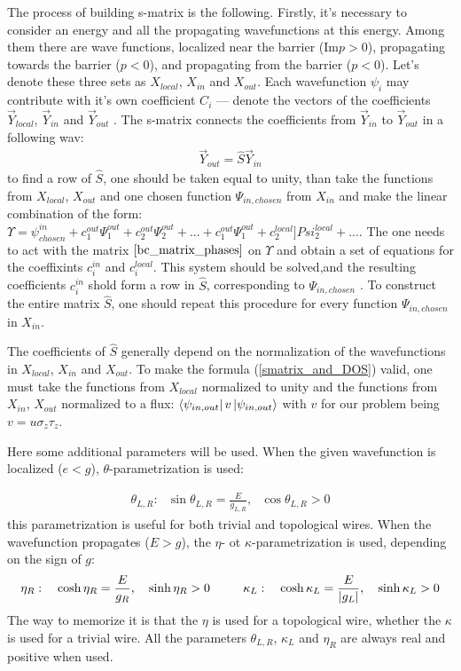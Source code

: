 The process of building s-matrix is the following. Firstly, it's necessary to consider an energy and all the propagating  wavefunctions at this energy. Among them there are wave functions, localized near the barrier ($ \mathrm{Im}p>0 $), propagating towards the barrier ($  p<0 $), and propagating from the barrier ($ p<0 $). Let's denote these  three sets as $ X_{local} $, $ X_{in}  $ and $ X_{out} $. Each wavefunction $ \psi_i $ may contribute with it's own coefficient $ C_i $ --- denote the vectors of the coefficients  $ \vec{Y}_{local} $, $ \vec{Y}_{in}  $ and $ \vec{Y}_{out} $ . The s-matrix connects the coefficients from $ \vec{Y}_{in}  $ to $ \vec{Y}_{out} $ in a following wav:
\begin{gather}
	\vec{Y}_{out} = \hat{S}\vec{Y}_{in}
\end{gather}
to find a row of $ \hat{S} $, one should be taken equal to unity, than take  the functions from $ X_{local} $, $ X_{out} $ and one chosen function $ \Psi_{in,chosen} $ from $ X_{in} $ and make the linear combination of the form: $\Upsilon =\psi^{in}_{chosen} + c^{out}_1\Psi^{out}_1+c^{out}_2\Psi^{out}_2+...+c^{out}_1\Psi^{out}_1+c^{local}_2]Psi^{local}_2+... $. The one needs to act with the matrix $ \ref{bc_matrix_phases} $ on $ \Upsilon $ and obtain a set of equations for the coeffixints $ {c^{in}_i} $ and $ {c^{local}_i} $. This system should be solved,and the resulting coefficients ${c^{in}_i}  $ shold form a row in $ \hat{S} $, corresponding to $ \Psi_{in,chosen} $ . To construct the entire matrix $ \hat{S} $, one should repeat this procedure for every function $ \Psi_{in,chosen} $ in $ X_{in} $.

The coefficients of $ \hat{S} $ generally depend on the normalization of the wavefunctions in $ X_{local} $, $ X_{in}  $ and $ X_{out} $. To make the formula (\ref{smatrix_and_DOS}) valid, one must take the functions from $ X_{local} $ normalized to unity and the functions from $ X_{in}  $, $ X_{out}$ normalized to a flux\cite{Akkermans_Avron_Shapiro_scattering_matrix}: $ \bra{\psi_{in,out}}v \ket{\psi_{in,out}} $ with $ v $ for our problem being $ v=u\sigma_z\tau_z $.

Here some additional parameters will be used. When the given wavefunction is localized ($ e<g $), $ \theta $-parametrization is used:

\begin{gather}
\theta_{L,R}:~~~\sin \theta_{L,R} =\frac{E}{g_{L,R}},~~~\cos \theta_{L,R}>0
\end{gather}
this parametrization is useful for both trivial and topological wires. When the wavefunction propagates ($ E>g $), the $ \eta $- ot $ \kappa $-parametrization is used, depending on the sign of $ g $:
\begin{gather}
	\eta_R: ~~~\cosh\eta_R = \frac{E}{g_R},~~~\sinh \eta_R >0
	~~~~~~~~
	\kappa_L: ~~~ \cosh\kappa_L= \frac{E}{\left|g_{L}\right|},~~~\sinh \kappa_L>0
\end{gather}
The way to memorize it is that the $ \eta $ is used for a topological wire, whether the $ \kappa $ is used for a trivial wire. All the parameters $ \theta_{L,R}  $,  $\kappa_L $ and $ \eta_R $ are always real and positive when used.

